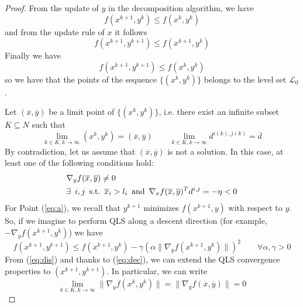 \begin{proof}
From the update of $y$ in the decomposition algorithm, we have
\begin{equation}
f(x^{k+1}, y^{k}) \leq f(x^{k}, y^{k})
\end{equation}
and from the update rule of $x$ it follows
\begin{equation}\label{eq:dec}
f(x^{k+1}, y^{k+1}) \leq f(x^{k+1}, y^{k})
\end{equation}
Finally we have
\begin{equation}
f(x^{k+1}, y^{k+1}) \leq f(x^{k}, y^{k})
\end{equation}
so we have that the points of the sequence $\{(x^{k}, y^{k})\}$ belongs to the level set $\mathcal{L}_0$.
\vspace{1.5cm}

Let $(\overline{x},\overline{y})$ be a limit point of $\{(x^k, y^k)\}$, i.e. there exist an infinite subset $K \subseteq N$ such that
\begin{equation}\label{eq:asim}
\lim_{k \in K, k \rightarrow \infty} (x^k, y^k) = (\overline{x},\overline{y}) \qquad \lim_{k \in K, k \rightarrow \infty} d^{i(k),j(k)} = \overline{d}
\end{equation}
By contradiction, let us assume that $(\overline{x},\overline{y})$ is not a solution. In this case, at least one of the following conditions hold:
\begin{subequations}
\begin{align}
&\nabla_y f(\overline{x},\overline{y}) \neq 0  \label{eq:a}\\
&\exists \enskip i, j \enskip  \text{s.t.} \enskip \overline{x}_i > l_i \enskip  \text{and} \enskip  \nabla_x f(\overline{x},\overline{y})^T d^{i,j} = -\eta < 0 \label{eq:b}
\end{align}
\end{subequations}
For Point (\ref{eq:a}), we recall that $y^{k+1}$ minimizes $f(x^{k+1},y)$ with respect to $y$. So, if we imagine to perform QLS along a descent direction (for example, $-\nabla_y f(x^{k+1},y^{k})$) we have
\begin{equation}\label{eq:dis}
f(x^{k+1}, y^{k+1}) \leq f(x^{k+1}, y^{k}) - \gamma (\alpha \parallel \nabla_y f(x^{k+1}, y^{k}) \parallel) ^2 \qquad \forall \alpha, \gamma > 0
\end{equation}
From (\ref{eq:dis}) and thanks to (\ref{eq:dec}), we can extend the QLS convergence properties to $(x^{k+1}, y^{k+1})$. In particular, we can write
\begin{equation}
\lim_{k \in K, k \rightarrow \infty} \parallel \nabla_y f(x^{k}, y^{k}) \parallel =  \parallel \nabla_y f(\overline{x},\overline{y}) \parallel = 0

\end{equation}
\end{proof}
